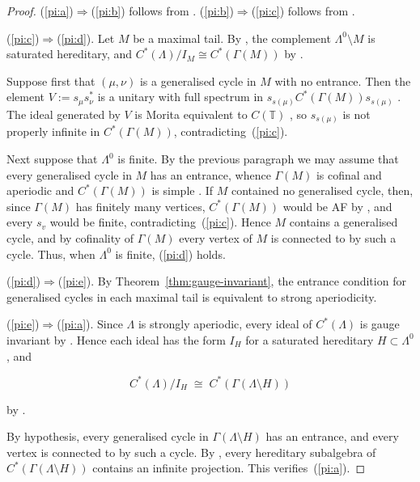 \documentclass[12pt]{amsart}
\theoremstyle{plain}
\theoremstyle{definition}
\theoremstyle{remark}
\begin{document}
\begin{proof}
(\ref{pi:a})$\Rightarrow$(\ref{pi:b}) follows from \cite[Proposition~4.7]{KR}.
(\ref{pi:b})$\Rightarrow$(\ref{pi:c}) follows from \cite[Proposition~4.16]{KR}.

\smallskip

(\ref{pi:c})$\Rightarrow$(\ref{pi:d}).  
Let $M$ be a maximal tail. By \cite[Theorem~3.12]{KaP}, the complement
$\Lambda^0\setminus M$ is saturated hereditary, and
$C^*(\Lambda)/I_M\cong C^*(\Gamma(M))$ by \cite[Theorem~5.2]{RSY1}.  

Suppose first that $(\mu,\nu)$ is a generalised cycle in $M$ with no
entrance. Then the element $V := s_\mu s_\nu^*$ is a unitary with full
spectrum in $s_{s(\mu)}C^*(\Gamma(M))s_{s(\mu)}$ \cite[Proposition~3.10]{ES}.
The ideal generated by $V$ is Morita equivalent to $C(\mathbb T)$
\cite[Lemma~3.9]{PRRS}, so $s_{s(\mu)}$ is not properly infinite in
$C^*(\Gamma(M))$, contradicting~(\ref{pi:c}).

Next suppose that $\Lambda^0$ is finite. By the previous paragraph we may
assume that every generalised cycle in $M$ has an entrance, whence
$\Gamma(M)$ is cofinal and aperiodic and $C^*(\Gamma(M))$ is simple
\cite{RS1}. If $M$ contained no generalised cycle, then, since $\Gamma(M)$
has finitely many vertices, $C^*(\Gamma(M))$ would be AF by
\cite[Proposition~5.4]{ES}, and every $s_v$ would be finite,
contradicting~(\ref{pi:c}). Hence $M$ contains a generalised cycle, and by
cofinality of $\Gamma(M)$ every vertex of $M$ is connected to by such a
cycle. Thus, when $\Lambda^0$ is finite, (\ref{pi:d}) holds.

\smallskip

(\ref{pi:d})$\Rightarrow$(\ref{pi:e}).  
By Theorem~\ref{thm:gauge-invariant}, the entrance condition for
generalised cycles in each maximal tail is equivalent to strong
aperiodicity.

\smallskip

(\ref{pi:e})$\Rightarrow$(\ref{pi:a}).  
Since $\Lambda$ is strongly aperiodic, every ideal of $C^*(\Lambda)$ is
gauge invariant by \cite[Theorem~7.2]{S}. Hence each ideal has the form
$I_H$ for a saturated hereditary $H\subset\Lambda^0$, and


\[
C^*(\Lambda)/I_H \;\cong\; C^*(\Gamma(\Lambda\setminus H))
\]


\noindent
by \cite[Theorem~5.2]{RSY1}.  

By hypothesis, every generalised cycle in $\Gamma(\Lambda\setminus H)$ has an
entrance, and every vertex is connected to by such a cycle. By
\cite[Proposition~8.8]{S}, every hereditary subalgebra of
$C^*(\Gamma(\Lambda\setminus H))$ contains an infinite projection. This
verifies~(\ref{pi:a}).
\end{proof}
\end{document}
